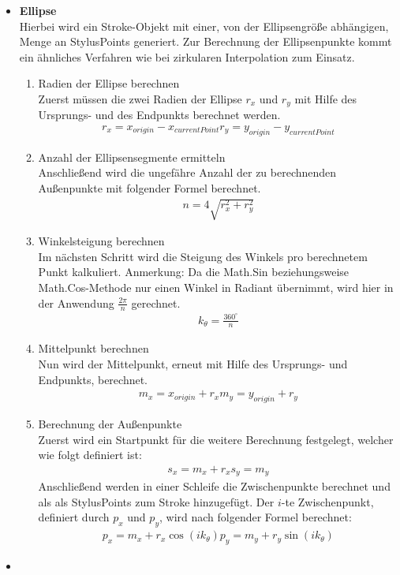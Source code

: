 \begin{itemize}
\item \textbf{Ellipse}\\ 
Hierbei wird ein Stroke-Objekt mit einer, von der Ellipsengröße abhängigen, Menge an StylusPoints generiert. Zur Berechnung der Ellipsenpunkte kommt ein ähnliches Verfahren wie bei zirkularen Interpolation zum Einsatz.
\begin{enumerate}
\item Radien der Ellipse berechnen\\
Zuerst müssen die zwei Radien der Ellipse $r_x$ und $r_y$ mit Hilfe des Ursprungs- und des Endpunkts berechnet werden.
\begin{align}
r_x = x_{origin} - x_{currentPoint}
r_y = y_{origin} - y_{currentPoint}
\end{align}
\item Anzahl der Ellipsensegmente ermitteln\\
Anschließend wird die ungefähre Anzahl der zu berechnenden Außenpunkte mit folgender Formel berechnet.
\begin{align}
n = 4 \sqrt{r_x^2+r_y^2}
\end{align}
\item Winkelsteigung berechnen\\
Im nächsten Schritt wird die Steigung des Winkels pro berechnetem Punkt kalkuliert.
Anmerkung: Da die Math.Sin beziehungsweise Math.Cos-Methode nur einen Winkel in Radiant übernimmt, wird hier in der Anwendung $\frac{2\pi}{n}$ gerechnet.
\begin{align}
k_{\theta} = \frac{360^\circ}{n}
\end{align}
\item Mittelpunkt berechnen\\
Nun wird der Mittelpunkt, erneut mit Hilfe des Ursprungs- und Endpunkts, berechnet.
\begin{align}
m_x = x_{origin} + r_x
m_y = y_{origin} + r_y
\end{align}
\item Berechnung der Außenpunkte\\
Zuerst wird ein Startpunkt für die weitere Berechnung festgelegt, welcher wie folgt definiert ist:
\begin{align}
s_x = m_x + r_x
s_y = m_y
\end{align}
Anschließend werden in einer Schleife die Zwischenpunkte berechnet und als als StylusPoints zum Stroke hinzugefügt. Der $i$-te Zwischenpunkt, definiert durch $p_x$ und $p_y$, wird nach folgender Formel berechnet:
\begin{align}
p_x = m_x + r_x \cos(ik_\theta)
p_y = m_y + r_y \sin(ik_\theta)
\end{align}
\end{enumerate}

\item
\end{itemize}
